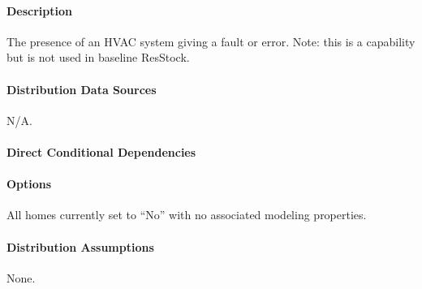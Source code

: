 \paragraph{Description}
% 
The presence of an HVAC system giving a fault or error. Note: this is a capability but is not used in baseline ResStock.

\paragraph{Distribution Data Sources}
% 
N/A.

\paragraph{Direct Conditional Dependencies}


\paragraph{Options}
All homes currently set to ``No'' with no associated modeling properties.

\paragraph{Distribution Assumptions}
% 
None.
